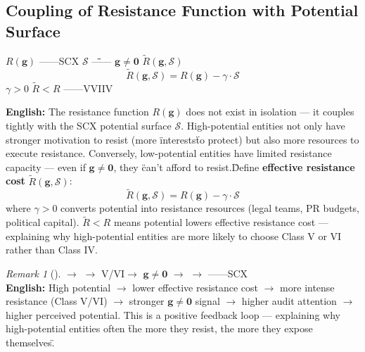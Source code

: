 \documentclass[12pt,a4paper]{article}
\theoremstyle{remark}
\newtheorem{remark}[theorem]{Remark}
\newcommand{\g}{\mathbf{g}}
\begin{document}
\subsection{}
\subsection{Coupling of Resistance Function with Potential Surface}

\noindent
\textbf{}  $ R(\g) $ ——SCX $ \mathcal{S} $ \"\"—— $ \g \neq \mathbf{0} $\"\"

\textbf{} $ \tilde{R}(\g, \mathcal{S}) $
\begin{equation}
    \tilde{R}(\g, \mathcal{S}) = R(\g) - \gamma \cdot \mathcal{S}
\end{equation}
 $ \gamma > 0 $ $ \tilde{R} < R $ ——VVIIV

\vspace{6pt}
\noindent
\textbf{English:} The resistance function $ R(\g) $ does not exist in isolation — it couples tightly with the SCX potential surface $ \mathcal{S} $. High-potential entities not only have stronger motivation to resist (more \"interests\" to protect) but also more resources to execute resistance. Conversely, low-potential entities have limited resistance capacity — even if $ \g \neq \mathbf{0} $, they \"can't afford to resist.\"

Define \textbf{effective resistance cost} $ \tilde{R}(\g, \mathcal{S}) $:
\begin{equation}
    \tilde{R}(\g, \mathcal{S}) = R(\g) - \gamma \cdot \mathcal{S}
\end{equation}
where $ \gamma > 0 $ converts potential into resistance resources (legal teams, PR budgets, political capital). $ \tilde{R} < R $ means potential lowers effective resistance cost — explaining why high-potential entities are more likely to choose Class V or VI rather than Class IV.

\begin{remark}[]
 $ \to $  $ \to $ V/VI$ \to $  $ \g \neq \mathbf{0} $  $ \to $  $ \to $ ——SCX\"\"\\
\textbf{English:} High potential $ \to $ lower effective resistance cost $ \to $ more intense resistance (Class V/VI) $ \to $ stronger $ \g \neq \mathbf{0} $ signal $ \to $ higher audit attention $ \to $ higher perceived potential. This is a positive feedback loop — explaining why high-potential entities often \"the more they resist, the more they expose themselves.\"
\end{remark}
\end{document}
